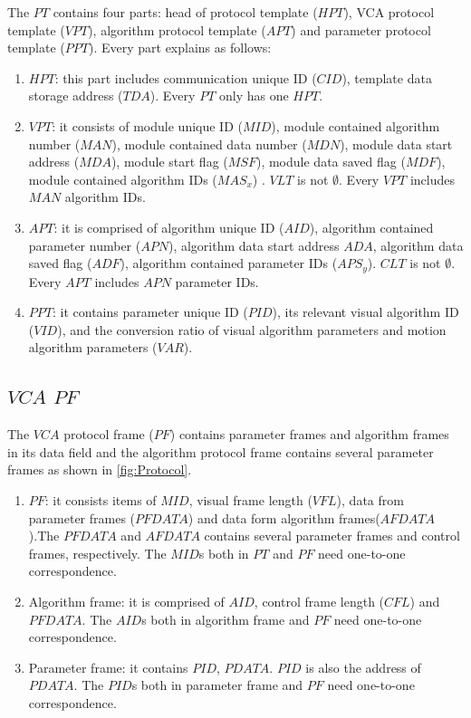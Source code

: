\documentclass[journal,UTF8]{IEEEtran}
\begin{document}
 The $PT$ contains four parts: head of protocol template ($HPT$), VCA protocol template ($VPT$), algorithm protocol template ($APT$) and parameter protocol template ($PPT$). Every part explains as follows: 
 \begin{enumerate}
 	\item $HPT$: this part includes communication unique ID ($CID$), template data storage address ($TDA$). Every $PT$ only has one $HPT$.
 	\item $VPT$: it consists of module unique ID ($MID$), module contained algorithm number ($MAN$), module contained data number ($MDN$), module data start address ($MDA$), module start flag ($MSF$), module data saved flag ($MDF$), module contained algorithm IDs ($MAS_x$) . $VLT$ is not $\emptyset$. Every $VPT$ includes $MAN$ algorithm IDs. 
 	\item $APT$: it is comprised of algorithm unique ID ($AID$), algorithm contained parameter number ($APN$), algorithm data start address $ADA$, algorithm data saved flag ($ADF$), algorithm contained parameter IDs ($APS_y$). $CLT$ is not $\emptyset$. Every $APT$ includes $APN$ parameter IDs.
 	\item $PPT$: it contains parameter unique ID ($PID$), its relevant visual algorithm ID ($VID$), and the conversion ratio of visual algorithm parameters and motion algorithm parameters ($VAR$).  
 \end{enumerate}
 \subsection{$VCA$ $PF$}
 The $VCA$ protocol frame ($PF$) contains parameter frames and algorithm frames in its data field and the algorithm protocol frame contains several parameter frames as shown in \ref{fig:Protocol}. 

 \begin{enumerate}
	\item $PF$: it consists items of $MID$, visual frame length ($VFL$), data from parameter frames ($PFDATA$) and data form algorithm frames($AFDATA$).The $PFDATA$ and $AFDATA$ contains several parameter frames and control frames, respectively. The $MID$s both in $PT$ and $PF$ need one-to-one correspondence.
	\item Algorithm frame: it is comprised of $AID$, control frame length ($CFL$) and $PFDATA$. The $AID$s both in algorithm frame and $PF$ need one-to-one correspondence.
	\item Parameter frame: it contains $PID$, $PDATA$. $PID$ is also the address of $PDATA$. The $PID$s both in parameter frame and $PF$ need one-to-one correspondence.
\end{enumerate}
\end{document}
